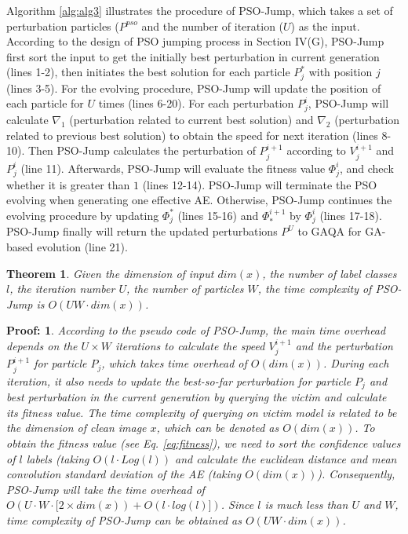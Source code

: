 \documentclass[lettersize,journal]{IEEEtran}
\begin{document}
	
	Algorithm \ref{alg:alg3} illustrates the procedure of PSO-Jump, which takes a set of perturbation particles ($P^{pso}$ and the number of iteration ($U$) as the input. According to the design of PSO jumping process in Section IV(G), PSO-Jump first sort the input to get the initially best perturbation in current generation (lines 1-2), then initiates the best solution for each particle $P^\ast_j$ with position $j$ (lines 3-5). For the evolving procedure, PSO-Jump will update the position of each particle for $U$ times (lines 6-20).  For each perturbation $P^i_j$, PSO-Jump will calculate $\nabla_1$ (perturbation related to current best solution) and $\nabla_2$ (perturbation related to previous best solution) to obtain the speed for next iteration (lines 8-10). Then PSO-Jump calculates the perturbation of $P^{i+1}_j$ according to  $V^{i+1}_j$ and $P^i_j$  (line 11). Afterwards, PSO-Jump will evaluate the fitness value $\Phi^i_j$, and check whether it is greater than $1$ (lines 12-14). PSO-Jump will terminate the PSO evolving when generating one effective AE. Otherwise, PSO-Jump continues the evolving procedure by updating $\Phi^\ast_j$ (lines 15-16) and  $\Phi^{i+1}_\ast$ by $\Phi^i_j$ (lines 17-18). PSO-Jump finally will return the updated perturbations $P^U$ to GAQA for GA-based evolution (line 21).
	
	\newtheorem{Theorem1}{Theorem} 
	\begin{Theorem1} 
		\textit{Given the dimension of input $dim(x)$, the number of label classes $l$, the iteration number $U$, the number of particles $W$, the time complexity of PSO-Jump is $O(UW \cdot dim(x))$.}
		\label{Theorem1}
	\end{Theorem1}
	
	\theoremstyle{nonumberplain}
	\theorembodyfont{\normalfont}
	\theoremsymbol{\mbox{$\Box$}}
	\newtheorem{pr1}{Proof:}
	\begin{pr1} 
		According to the pseudo code of PSO-Jump, the main time overhead depends on the $U \times W$ iterations to calculate the speed $V^{i+1}_j$ and the perturbation $P^{i+1}_j$ for particle $P_j$, which takes time overhead of $O(dim(x))$. During each iteration, it also needs to update the best-so-far perturbation for particle $P_j$ and best perturbation in the current generation by querying the victim and calculate its fitness value. The time complexity of querying on victim model is related to be the dimension of clean image $x$, which can be denoted as $O(dim(x))$. To obtain the fitness value (see Eq. \ref{eq:fitness}), we need to sort the confidence values of $l$ labels (taking $O(l\cdot Log(l))$ and calculate the euclidean distance and mean convolution standard deviation of the AE (taking $O(dim(x))$). Consequently, PSO-Jump will take the time overhead of $O(U\cdot W \cdot [2 \times dim(x))+ O(l \cdot log(l)])$. Since $l$ is much less than $U$ and $W$, time complexity of PSO-Jump can be obtained as $O(UW\cdot dim(x))$.
		\theoremsymbol{\mbox{$\Box$}}
	\end{pr1}
	
\end{document}
